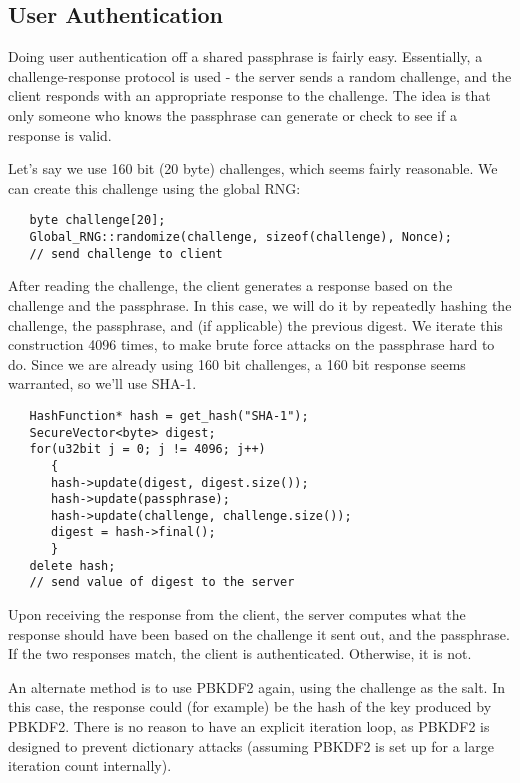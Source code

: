 \documentclass{article}
\begin{document}
\subsection{User Authentication}

Doing user authentication off a shared passphrase is fairly easy. Essentially,
a challenge-response protocol is used - the server sends a random challenge,
and the client responds with an appropriate response to the challenge. The idea
is that only someone who knows the passphrase can generate or check to see if a
response is valid.

Let's say we use 160 bit (20 byte) challenges, which seems fairly
reasonable. We can create this challenge using the global RNG:

\begin{verbatim}
   byte challenge[20];
   Global_RNG::randomize(challenge, sizeof(challenge), Nonce);
   // send challenge to client
\end{verbatim}

After reading the challenge, the client generates a response based on the
challenge and the passphrase. In this case, we will do it by repeatedly hashing
the challenge, the passphrase, and (if applicable) the previous digest. We
iterate this construction 4096 times, to make brute force attacks on the
passphrase hard to do. Since we are already using 160 bit challenges, a 160 bit
response seems warranted, so we'll use SHA-1.

\begin{verbatim}
   HashFunction* hash = get_hash("SHA-1");
   SecureVector<byte> digest;
   for(u32bit j = 0; j != 4096; j++)
      {
      hash->update(digest, digest.size());
      hash->update(passphrase);
      hash->update(challenge, challenge.size());
      digest = hash->final();
      }
   delete hash;
   // send value of digest to the server
\end{verbatim}

Upon receiving the response from the client, the server computes what the
response should have been based on the challenge it sent out, and the
passphrase. If the two responses match, the client is authenticated.
Otherwise, it is not.

An alternate method is to use PBKDF2 again, using the challenge as the salt. In
this case, the response could (for example) be the hash of the key produced by
PBKDF2. There is no reason to have an explicit iteration loop, as PBKDF2 is
designed to prevent dictionary attacks (assuming PBKDF2 is set up for a large
iteration count internally).
\end{document}
